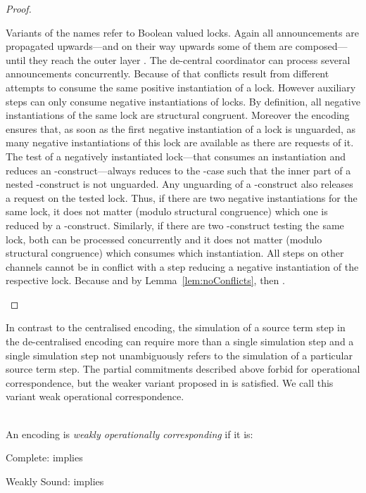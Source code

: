 \documentclass[]{eptcs}
\begin{document}
\begin{proof}
\begin{compactenum}
		\item Variants of the names  refer to Boolean valued locks. Again all announcements are propagated upwards---and on their way upwards some of them are composed---until they reach the outer layer . The de-central coordinator can process several announcements concurrently. Because of that conflicts result from different attempts to consume the same positive instantiation of a lock. However auxiliary steps can only consume negative instantiations of locks.
			By definition, all negative instantiations of the same lock are structural congruent. Moreover the encoding ensures that, as soon as the first negative instantiation of a lock is unguarded, as many negative instantiations of this lock are available as there are requests of it. The test of a negatively instantiated lock---that consumes an instantiation and reduces an -construct---always reduces to the -case such that the inner part of a nested -construct is not unguarded. Any unguarding of a -construct also releases a request on the tested lock.
			Thus, if there are two negative instantiations for the same lock, it does not matter (modulo structural congruence) which one is reduced by a -construct. Similarly, if there are two -construct testing the same lock, both can be processed concurrently and it does not matter (modulo structural congruence) which consumes which instantiation.
			All steps on other channels cannot be in conflict with a step reducing a negative instantiation of the respective lock. Because  and by Lemma~\ref{lem:noConflicts}, then .
	\end{compactenum}
\end{proof}

In contrast to the centralised encoding, the simulation of a source term step in the de-centralised encoding can require more than a single simulation step and a single simulation step not unambiguously refers to the simulation of a particular source term step. The partial commitments described above forbid for operational correspondence, but the weaker variant proposed in \cite{gorla10} is satisfied. We call this variant weak operational correspondence.

\begin{definition}
	\\
	An encoding  is \emph{weakly operationally corresponding} \wrt  if it is:
	\begin{compactitem}
		\item[\; Complete:]  implies 
		\item[\; Weakly Sound:]  implies 
	\end{compactitem}
\end{definition}
\end{document}
